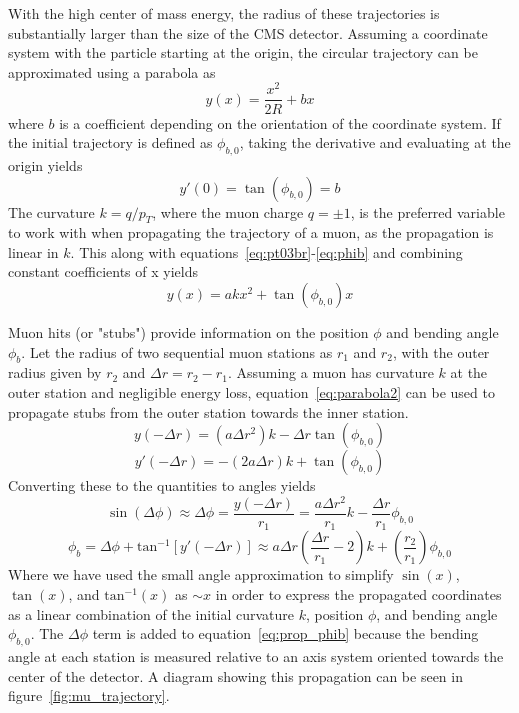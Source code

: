 With the high center of mass energy, the radius of these trajectories is substantially larger than the size of the CMS detector. Assuming a coordinate system with the particle starting at the origin, the circular trajectory can be approximated using a parabola as
\begin{equation}
	\label{eq:parabola1}
	y(x)=\frac{x^2}{2R}+bx
\end{equation}
where $b$ is a coefficient depending on the orientation of the coordinate system. If the initial trajectory is defined as $\phi_{b,0}$, taking the derivative and evaluating at the origin yields
\begin{equation}
	\label{eq:phib}
	y'(0)=\tan(\phi_{b,0})=b
\end{equation}	
The curvature $k=q/p_{T}$, where the muon charge $q=\pm1$, is the preferred variable to work with when propagating the trajectory of a muon, as the propagation is linear in $k$. This along with equations~\ref{eq:pt03br}-\ref{eq:phib} and combining constant coefficients of x yields
\begin{equation}
	\label{eq:parabola2}
	y(x)=akx^2+\tan(\phi_{b,0})x
\end{equation}

Muon hits (or "stubs") provide information on the position $\phi$ and bending angle $\phi_b$. Let the radius of two sequential muon stations as $r_1$ and $r_2$, with the outer radius given by $r_2$ and $\Delta r=r_2-r_1$. Assuming a muon has curvature $k$ at the outer station and negligible energy loss, equation~\ref{eq:parabola2} can be used to propagate stubs from the outer station towards the inner station.
\begin{equation}
	y(-\Delta r) = \left(a\Delta r^2\right)k-\Delta r\tan(\phi_{b,0})
\end{equation}
\begin{equation}
	y'(-\Delta r)=-\left(2a\Delta r\right)k+\tan(\phi_{b,0})
\end{equation}
Converting these to the quantities to angles yields
\begin{equation}
	\label{eq:prop_phi}
	\sin(\Delta\phi)\approx\Delta\phi=\frac{y(-\Delta r)}{r_1} = \frac{a\Delta r^2}{r_1}k-\frac{\Delta r}{r_1}\phi_{b,0}
\end{equation}
\begin{equation}
	\label{eq:prop_phib}
	\phi_b=\Delta\phi+\mathrm{tan}^{-1}\left[y'(-\Delta r)\right]\approx a\Delta r\left(\frac{\Delta r}{r_1}-2\right)k+\left(\frac{r_2}{r_1}\right)\phi_{b,0}
\end{equation}
Where we have used the small angle approximation to simplify $\sin(x)$, $\tan(x)$, and $\mathrm{tan}^{-1}(x)$ as $\sim x$ in order to express the propagated coordinates as a linear combination of the initial curvature $k$, position $\phi$, and bending angle $\phi_{b,0}$. The $\Delta\phi$ term is added to equation~\ref{eq:prop_phib} because the bending angle at each station is measured relative to an axis system oriented towards the center of the detector. A diagram showing this propagation can be seen in figure~\ref{fig:mu_trajectory}.

